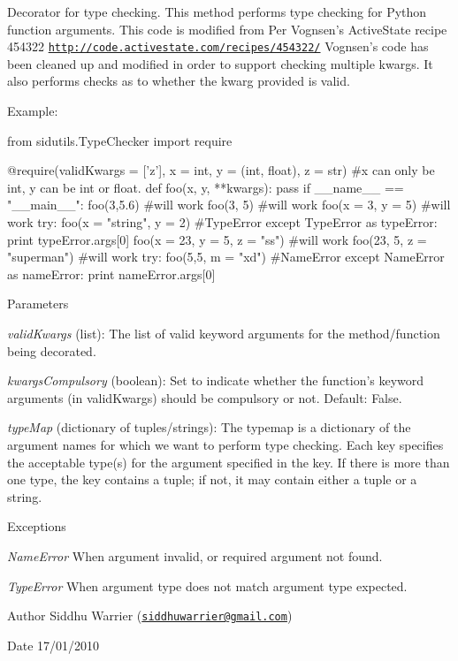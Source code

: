 Decorator for type checking. This method performs type checking for Python function arguments. This code is modified from Per Vognsen's ActiveState recipe 454322 \href{http://code.activestate.com/recipes/454322/}{\tt http://code.activestate.com/recipes/454322/} Vognsen's code has been cleaned up and modified in order to support checking multiple kwargs. It also performs checks as to whether the kwarg provided is valid.

Example: 
\begin{DoxyCode}
from sidutils.TypeChecker import require

@require(validKwargs = ['z'], x = int, y = (int, float), z = str) #x can only be 
      int, y can be int or float.
def foo(x, y, **kwargs):
        pass
if __name__ == "__main__":
    foo(3,5.6) #will work
    foo(3, 5) #will work
    foo(x = 3, y = 5) #will work
    try:
        foo(x = "string", y = 2) #TypeError
    except TypeError as typeError:
        print typeError.args[0]
    foo(x = 23, y = 5, z = "ss") #will work
    foo(23, 5, z = "superman") #will work
    try:
        foo(5,5, m = "xd") #NameError
    except NameError as nameError:
        print nameError.args[0]
\end{DoxyCode}



\begin{DoxyParams}{Parameters}
\item[{\em validKwargs}](list): The list of valid keyword arguments for the method/function being decorated. \item[{\em kwargsCompulsory}](boolean): Set to indicate whether the function's keyword arguments (in validKwargs) should be compulsory or not. Default: False. \item[{\em typeMap}](dictionary of tuples/strings): The typemap is a dictionary of the argument names for which we want to perform type checking. Each key specifies the acceptable type(s) for the argument specified in the key. If there is more than one type, the key contains a tuple; if not, it may contain either a tuple or a string. \end{DoxyParams}

\begin{DoxyExceptions}{Exceptions}
\item[{\em NameError}]When argument invalid, or required argument not found. \item[{\em TypeError}]When argument type does not match argument type expected. \end{DoxyExceptions}
\begin{DoxyAuthor}{Author}
Siddhu Warrier (\href{mailto:siddhuwarrier@gmail.com}{\tt siddhuwarrier@gmail.com}) 
\end{DoxyAuthor}
\begin{DoxyDate}{Date}
17/01/2010 
\end{DoxyDate}
